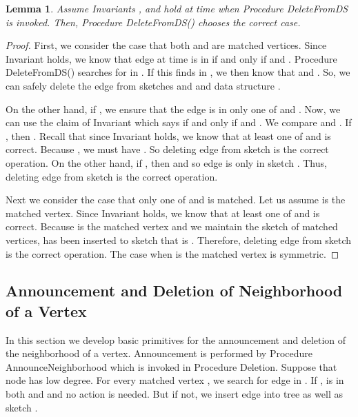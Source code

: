\documentclass[11pt,letter]{article}
\newtheorem{lemma}[theorem]{Lemma}
\begin{document}
\begin{lemma}
\label{lem:timestamps:case:3}
Assume Invariants ,  and  hold at time  when Procedure
{\sf DeleteFromDS} is invoked.
Then, Procedure {\sf DeleteFromDS()} chooses the correct case.
\end{lemma}

\begin{proof}
First, we consider the case that  both  and  are matched vertices.
Since Invariant  holds, we know that edge 
at time  is in  if and only if
 and .
Procedure {\sf DeleteFromDS()} searches for  in .
If this finds  in , we then know that 
and . So, we can safely delete the edge from
sketches  and  and data structure .

On the other hand, if , we ensure that the edge
is in only one of  and .  Now, we can use the claim of Invariant
 which says  if and only if  and .
We compare  and . If , then .
Recall that since Invariant  holds, we know that at least one of 
and  is correct.
Because , we must have .
So deleting edge  from sketch  is the correct operation.
On the other hand, if , then  and so
edge  is only in sketch . Thus, deleting edge  from
sketch  is the correct operation.

Next we consider the case that only one of  and  is matched.
Let us assume  is the matched vertex.
Since Invariant  holds, we know that at least one of 
and  is correct. Because  is the matched vertex and
we maintain the sketch of matched vertices,  has been inserted to sketch
 that is . Therefore,
deleting edge  from sketch  is the correct operation.
The case when  is the matched vertex is symmetric.
\end{proof}





\subsection{Announcement and Deletion of Neighborhood of a Vertex}
In this section we develop basic primitives for the announcement
and deletion of the neighborhood of a vertex.
Announcement is performed by
Procedure {\sf AnnounceNeighborhood} which is
invoked in Procedure {\sf Deletion}.
Suppose that node  has low degree.
For every matched vertex ,
we search for edge  in . If ,
 is in both  and  and no action is needed.
But if not, we insert edge  into tree  as well as
sketch .
\end{document}
